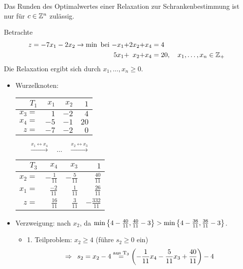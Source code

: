 \begin{bemerkung}
	Das Runden des Optimalwertes einer Relaxation zur Schrankenbestimmung ist nur für $c \in \mathbb{Z}^n$ zulässig.
\end{bemerkung}

\begin{beispiel}
	Betrachte 
	\begin{equation*}
	\begin{alignedat}{4}
		z = -7x_1 - 2x_2 \to \min \text{ bei } &&-x_1 &+ &2x_2 &+ &x_4 &= 4 \\
		&&5x_1 &+ &x_2 &+ &x_4 &= 20, \quad x_1, \dots, x_n \in \mathbb{Z}_+
	\end{alignedat}
	\end{equation*}
	Die Relaxation ergibt sich durch $x_1, \dots, x_n \ge 0$.
	\begin{itemize}[leftmargin=*]
		\item Wurzelknoten:
		\begin{center}
			\begin{tabular}{r|rr|r}
				$T_1$ & $x_1$ & $x_2$ & $1$ \\ \hline
				$x_3 = $ & $1$ & $-2$ & $4$ \\
				$x_4 = $ & $-5$ & $-1$ & $20$ \\ \hline
				$z = $   & $-7$ & $-2$ & $0$
			\end{tabular}
			$\qquad \overset{x_1 \leftrightarrow x_4}{\longrightarrow} \quad \dots \quad \overset{x_2 \leftrightarrow x_3}{\longrightarrow} \qquad$
			\begin{tabular}{r|rr|r}
				$T_3$ & $x_4$ & $x_3$ & $1$ \\ \hline
				$x_2 = $ & $-\frac{1}{11}$ & $-\frac{5}{11}$ & $\frac{40}{11}$ \\
				$x_1 = $ & $\frac{-2}{11}$ & $\frac{1}{11}$ & $\frac{26}{11}$ \\ \hline
				$z = $   & $\frac{16}{11}$ & $\frac{3}{11}$ & $-\frac{332}{11}$
			\end{tabular}
		\end{center}	
		\item Verzweigung: nach $x_2$, da $\min \left\{ 4-\frac{40}{11}, \frac{40}{11} - 3 \right\} > \min \left\{ 4 - \frac{36}{11}, \frac{36}{11} - 3 \right\}$. 
		\begin{itemize}
			\item 1. Teilproblem: $x_2 \ge 4$ (führe $s_2 \ge 0$ ein)
			\begin{equation*}
				\begin{aligned}
					\follows s_2 &= x_2 - 4 
					\overset{\text{aus T}_3}{=} \brackets{-\frac{1}{11}x_4 - \frac{5}{11} x_3 + \frac{40}{11}} - 4 \\

\end{aligned}
\end{equation*}
\end{itemize}
\end{itemize}
\end{beispiel}
